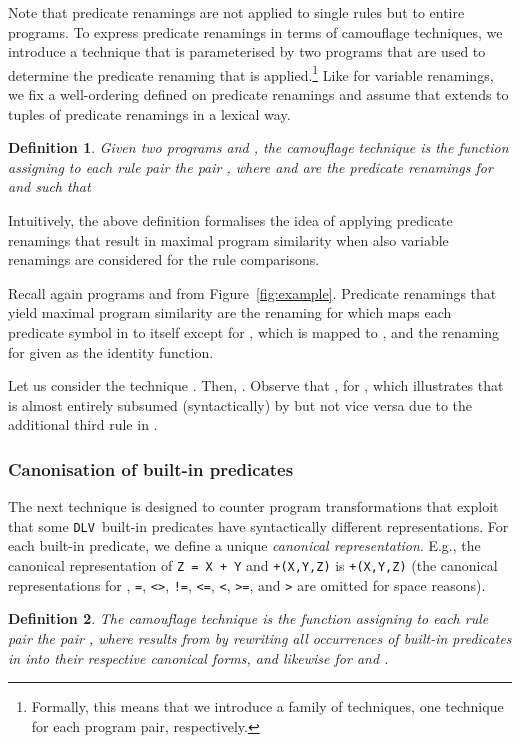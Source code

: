 \documentclass{tlp}
\newcommand{\dlv}{\texttt{DLV}\xspace}
\newtheorem{definition}{Definition}
\begin{document}
Note that predicate renamings are not applied to single rules but to entire programs.
To express predicate renamings in terms of camouflage techniques, we 
introduce a  technique that is parameterised by two programs that are used to determine
 the predicate renaming that is applied.\footnote{Formally, this means that we introduce a family of techniques, one technique for each  program pair, respectively.}
Like for variable renamings, we fix a well-ordering  defined on predicate renamings
and assume that   extends to tuples of predicate renamings in a lexical way.

\begin{definition}\label{def:predrenaming}
Given two programs  and , the camouflage technique  is the function assigning to
each rule pair  the pair
,
where  and  are the predicate renamings for  and  such that

\end{definition}


Intuitively, the above definition formalises the idea of applying predicate renamings that result in maximal
program similarity when also variable renamings are considered for the rule comparisons. 

Recall again programs  and  from Figure~\ref{fig:example}. 
Predicate renamings that yield maximal program similarity are
the renaming  for  which maps each predicate symbol in  to itself except
for , which is mapped to , and the renaming  for  given as the identity function. 
 
Let us consider the technique .
Then,
.
Observe
that , for , which
illustrates that
 is almost entirely subsumed (syntactically) by  but not vice versa due to the additional third rule in .

\subsubsection{Canonisation of built-in predicates}

The next technique is designed to counter program transformations that exploit that
some \dlv\ built-in predicates have  syntactically  different 
representations.
For each built-in predicate, we define a unique \emph{canonical  representation}.
E.g., the canonical representation of {\tt Z = X + Y} and {\tt +(X,Y,Z)} is {\tt +(X,Y,Z)} (the canonical representations for {\tt  *}, {\tt  =}, {\tt  <>}, {\tt  !=}, {\tt  <=}, {\tt  <}, {\tt  >=}, and {\tt  >} are omitted for space reasons).

\begin{definition}\label{def:canonisation}
The camouflage technique  is the function assigning to each rule pair  the pair ,
where  results from  by rewriting all occurrences of built-in predicates in  into their respective canonical forms, and likewise for  and .
\end{definition}
\end{document}
